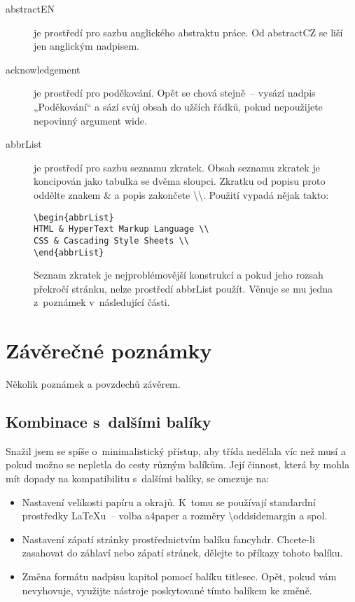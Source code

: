 \documentclass[FM,DP]{tulthesis}
\newcommand{\argument}[1]{{\ttfamily\color{\tulcolor}#1}}
\newcommand{\prikaz}[1]{\argument{\textbackslash #1}}
\begin{document}
\begin{description}
\item[\argument{abstractEN}] je prostředí pro sazbu anglického abstraktu práce.
Od \argument{abstractCZ} se liší jen anglickým nadpisem.

\item[\argument{acknowledgement}] je prostředí pro poděkování. Opět se chová
stejně~-- vysází nadpis „Poděkování“ a sází svůj obsah do užších řádků, pokud
nepoužijete nepovinný argument \argument{wide}.

\item[\argument{abbrList}] je prostředí pro sazbu seznamu zkratek. Obsah
seznamu zkratek je koncipován jako tabulka se dvěma sloupci. Zkratku od popisu
proto oddělte znakem \argument{\&} a popis zakončete
\argument{\textbackslash\textbackslash}. Použití vypadá nějak takto:

{\color{\tulcolor}
\begin{verbatim}
\begin{abbrList}
HTML & HyperText Markup Language \\
CSS & Cascading Style Sheets \\
\end{abbrList}
\end{verbatim}}

Seznam zkratek je nejproblémovější konstrukcí a pokud jeho rozsah překročí
stránku, nelze prostředí \argument{abbrList} použít. Věnuje se mu jedna
z~poznámek v~následující části.

\end{description}


\chapter{Závěrečné poznámky}

Několik poznámek a povzdechů závěrem.


\section{Kombinace s~dalšími balíky}

Snažil jsem se spíše o~minimalistický přístup, aby třída nedělala víc než musí
a pokud možno se nepletla do cesty různým balíkům. Její činnost, která by
mohla mít dopady na kompatibilitu s~dalšími balíky, se omezuje na:

\begin{itemize}
\item Nastavení velikosti papíru a okrajů. K~tomu se používají standardní
prostředky \LaTeX u~-- volba \argument{a4paper} a rozměry
\prikaz{oddsidemargin} a spol.

\item Nastavení zápatí stránky prostřednictvím balíku \argument{fancyhdr}.
Chcete-li zasahovat do záhlaví nebo zápatí stránek, dělejte to příkazy tohoto
balíku.

\item Změna formátu nadpisu kapitol pomocí balíku \argument{titlesec}. Opět,
pokud vám nevyhovuje, využijte nástroje poskytované tímto balíkem ke změně.

\end{itemize}
\end{document}
